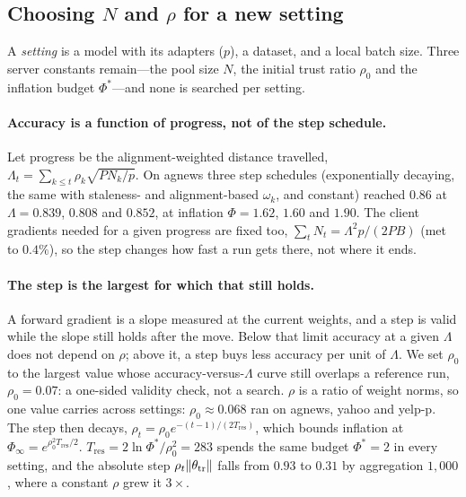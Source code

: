 \subsection{Choosing $N$ and $\rho$ for a new setting}
\label{sec:ft:setting}
A \emph{setting} is a model with its adapters ($p$), a dataset, and a local batch size. Three server constants remain---the pool size $N$, the initial trust ratio $\rho_0$ and the inflation budget $\Phi^*$---and none is searched per setting.

\paragraph{Accuracy is a function of progress, not of the step schedule.}
Let progress be the alignment-weighted distance travelled, $\Lambda_t=\sum_{k\le t}\rho_k\sqrt{PN_k/p}$.
On agnews three step schedules (exponentially decaying, the same with staleness- and alignment-based $\omega_k$, and constant) reached $0.86$ at $\Lambda=0.839$, $0.808$ and $0.852$,
at inflation $\Phi=1.62$, $1.60$ and $1.90$. The client gradients needed for a given progress are fixed too, $\sum_tN_t=\Lambda^2p/(2PB)$ (met to $0.4\%$),
so the step changes how fast a run gets there, not where it ends.

\paragraph{The step is the largest for which that still holds.}
A forward gradient is a slope measured at the current weights, and a step is valid while the slope still holds after the move. Below that limit accuracy at a given $\Lambda$ does not depend on $\rho$; above it, a step buys less accuracy per unit of $\Lambda$.
We set $\rho_0$ to the largest value whose accuracy-versus-$\Lambda$ curve still overlaps a reference run, $\rho_0=0.07$: a one-sided validity check, not a search.
$\rho$ is a ratio of weight norms, so one value carries across settings: $\rho_0\approx0.068$ ran on agnews, yahoo and yelp-p.
The step then decays, $\rho_t=\rho_0e^{-(t-1)/(2T_{\mathrm{res}})}$, which bounds inflation at $\Phi_\infty=e^{\rho_0^2T_{\mathrm{res}}/2}$. $T_{\mathrm{res}}=2\ln\Phi^*/\rho_0^2=283$ spends the same budget $\Phi^*=2$ in every setting,
and the absolute step $\rho_t\lVert \theta_{\mathrm{tr}}\rVert$ falls from $0.93$ to $0.31$ by aggregation $1{,}000$, where a constant $\rho$ grew it $3\times$.

